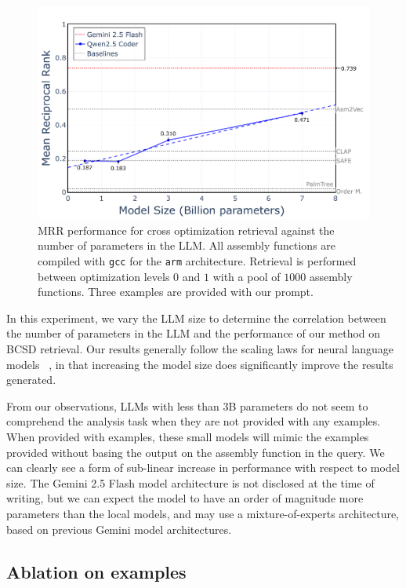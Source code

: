 \begin{figure}
\centerline{\includegraphics[width=\linewidth]{../graphs/size-ablation}}
\caption{MRR performance for cross optimization retrieval against the number of parameters in the LLM. All assembly functions are compiled
with \texttt{gcc} for the \texttt{arm} architecture. Retrieval is performed between optimization levels \(0\) and \(1\) with a pool of \(1000\) assembly functions.
Three examples are provided with our prompt.}
\label{size-abl}
\end{figure}

In this experiment, we vary the LLM size to determine the correlation between the number of parameters in the LLM and the performance
of our method on BCSD retrieval. Our results generally follow the scaling laws for neural language models ~\cite{scaling-laws}, in that increasing
the model size does significantly improve the results generated.

From our observations, LLMs with less than \(3\)B parameters do not seem to comprehend the analysis task when
they are not provided with any examples. When provided with examples, these small models will mimic the examples provided without basing the
output on the assembly function in the query. We can clearly see a form of sub-linear increase in performance with respect to model size.
The Gemini 2.5 Flash model architecture is not disclosed at the time of writing, but we can expect the model to have an order
of magnitude more parameters than the local models, and may use a mixture-of-experts architecture, based on previous Gemini model architectures.

\subsection{Ablation on examples}

